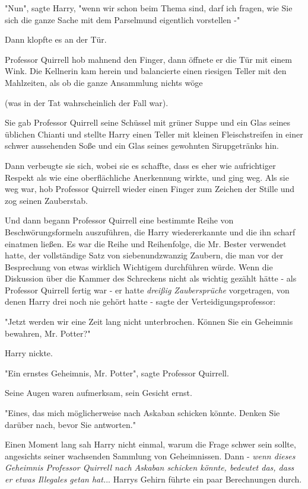 {"Nun", sagte Harry, "wenn wir schon beim Thema sind, darf ich fragen, wie Sie sich die ganze Sache mit dem Parselmund eigentlich vorstellen -"

Dann klopfte es an der Tür.

Professor Quirrell hob mahnend den Finger, dann öffnete er die Tür mit einem Wink. Die Kellnerin kam herein und balancierte einen riesigen Teller mit den Mahlzeiten, als ob die ganze Ansammlung nichts wöge

(was in der Tat wahrscheinlich der Fall war).

Sie gab Professor Quirrell seine Schüssel mit grüner Suppe und ein Glas seines üblichen Chianti und stellte Harry einen Teller mit kleinen Fleischstreifen in einer schwer aussehenden Soße und ein Glas seines gewohnten Sirupgetränks hin.

Dann verbeugte sie sich, wobei sie es schaffte, dass es eher wie aufrichtiger Respekt als wie eine oberflächliche Anerkennung wirkte, und ging weg. Als sie weg war, hob Professor Quirrell wieder einen Finger zum Zeichen der Stille und zog seinen Zauberstab.

Und dann begann Professor Quirrell eine bestimmte Reihe von Beschwörungsformeln auszuführen, die Harry wiedererkannte und die ihn scharf einatmen ließen. Es war die Reihe und Reihenfolge, die Mr. Bester verwendet hatte, der vollständige Satz von siebenundzwanzig Zaubern, die man vor der Besprechung von etwas wirklich Wichtigem durchführen würde. Wenn die Diskussion über die Kammer des Schreckens nicht als wichtig gezählt hätte - als Professor Quirrell fertig war - er hatte \emph{dreißig Zaubersprüche} vorgetragen, von denen Harry drei noch nie gehört hatte - sagte der Verteidigungsprofessor:

"Jetzt werden wir eine Zeit lang nicht unterbrochen. Können Sie ein Geheimnis bewahren, Mr. Potter?"

Harry nickte.

"Ein ernstes Geheimnis, Mr. Potter", sagte Professor Quirrell.

Seine Augen waren aufmerksam, sein Gesicht ernst.

"Eines, das mich möglicherweise nach Askaban schicken könnte. Denken Sie darüber nach, bevor Sie antworten."

Einen Moment lang sah Harry nicht einmal, warum die Frage schwer sein sollte, angesichts seiner wachsenden Sammlung von Geheimnissen. Dann - \emph{wenn dieses Geheimnis Professor Quirrell nach Askaban schicken könnte, bedeutet das, dass er etwas Illegales getan hat.}.. Harrys Gehirn führte ein paar Berechnungen durch.

}
